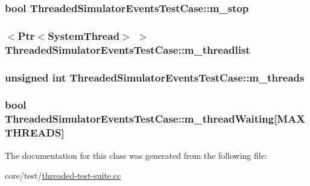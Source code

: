 \subsubsection[{\texorpdfstring{m\+\_\+stop}{m_stop}}]{\setlength{\rightskip}{0pt plus 5cm}bool Threaded\+Simulator\+Events\+Test\+Case\+::m\+\_\+stop}\hypertarget{classThreadedSimulatorEventsTestCase_a1766d752819df18fbbc8cadd0b1fd8be}{}\label{classThreadedSimulatorEventsTestCase_a1766d752819df18fbbc8cadd0b1fd8be}
\subsubsection[{\texorpdfstring{m\+\_\+threadlist}{m_threadlist}}]{$<${\bf Ptr}$<${\bf System\+Thread}$>$ $>$ Threaded\+Simulator\+Events\+Test\+Case\+::m\+\_\+threadlist}\hypertarget{classThreadedSimulatorEventsTestCase_a8b709eaeff9207f826fc1eda60ea4ea4}{}\label{classThreadedSimulatorEventsTestCase_a8b709eaeff9207f826fc1eda60ea4ea4}
\subsubsection[{\texorpdfstring{m\+\_\+threads}{m_threads}}]{\setlength{\rightskip}{0pt plus 5cm}unsigned int Threaded\+Simulator\+Events\+Test\+Case\+::m\+\_\+threads}\hypertarget{classThreadedSimulatorEventsTestCase_abd257402dfdeba9f78a88c16308feace}{}\label{classThreadedSimulatorEventsTestCase_abd257402dfdeba9f78a88c16308feace}
\subsubsection[{\texorpdfstring{m\+\_\+thread\+Waiting}{m_threadWaiting}}]{\setlength{\rightskip}{0pt plus 5cm}bool Threaded\+Simulator\+Events\+Test\+Case\+::m\+\_\+thread\+Waiting\mbox{[}{\bf M\+A\+X\+T\+H\+R\+E\+A\+DS}\mbox{]}}\hypertarget{classThreadedSimulatorEventsTestCase_a6446720106613ed6b8e2de71abbdc166}{}\label{classThreadedSimulatorEventsTestCase_a6446720106613ed6b8e2de71abbdc166}


The documentation for this class was generated from the following file\+:\begin{DoxyCompactItemize}
\item 
core/test/\hyperlink{threaded-test-suite_8cc}{threaded-\/test-\/suite.\+cc}\end{DoxyCompactItemize}
